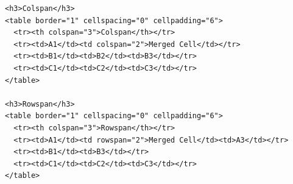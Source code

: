 \par\smallskip
{}
\par{}\par\smallskip
\begin{verbatim}
<h3>Colspan</h3>
<table border="1" cellspacing="0" cellpadding="6">
  <tr><th colspan="3">Colspan</th></tr>
  <tr><td>A1</td><td colspan="2">Merged Cell</td></tr>
  <tr><td>B1</td><td>B2</td><td>B3</td></tr>
  <tr><td>C1</td><td>C2</td><td>C3</td></tr>
</table>

<h3>Rowspan</h3>
<table border="1" cellspacing="0" cellpadding="6">
  <tr><th colspan="3">Rowspan</th></tr>
  <tr><td>A1</td><td rowspan="2">Merged Cell</td><td>A3</td></tr>
  <tr><td>B1</td><td>B3</td></tr>
  <tr><td>C1</td><td>C2</td><td>C3</td></tr>
</table>
\end{verbatim}
\smallskip


